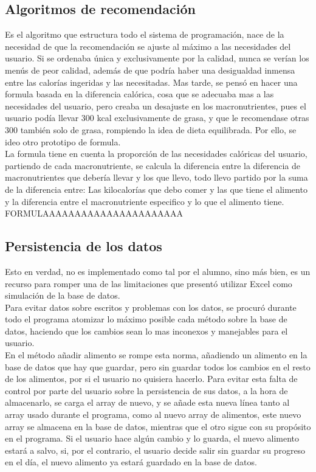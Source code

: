 \subsection{Algoritmos de recomendación}
Es el algoritmo que estructura todo el sistema de programación, nace de la necesidad de que la recomendación se ajuste al máximo a las necesidades del usuario. Si se ordenaba única y exclusivamente por la calidad, nunca se verían los menús de peor calidad, además de que podría haber una desigualdad inmensa entre las calorías ingeridas y las necesitadas. Mas tarde, se pensó en hacer una formula basada en la diferencia calórica, cosa que se adecuaba mas a las necesidades del usuario, pero creaba un desajuste en los macronutrientes, pues el usuario podía llevar 300 kcal exclusivamente de grasa, y que le recomendase otras 300 también solo de grasa, rompiendo la idea de dieta equilibrada. Por ello, se ideo otro prototipo de formula.\\
La formula tiene en cuenta la proporción de las necesidades calóricas del usuario, partiendo de cada macronutriente, se calcula la diferencia entre la diferencia de macronutrientes que debería llevar y los que llevo, todo llevo partido por la suma de la diferencia entre: Las kilocalorías que debo comer y las que tiene el alimento y la diferencia entre el macronutriente especifico y lo que el alimento tiene.\\
FORMULAAAAAAAAAAAAAAAAAAAAAA
\subsection{Persistencia de los datos}
Esto en verdad, no es implementado como tal por el alumno, sino más bien, es un recurso para romper una de las limitaciones que presentó utilizar Excel como simulación de la base de datos.\\
Para evitar datos sobre escritos y problemas con los datos, se procuró durante todo el programa atomizar lo máximo posible cada método sobre la base de datos, haciendo que los cambios sean lo mas inconexos y manejables para el usuario. \\

En el método añadir alimento se rompe esta norma, añadiendo un alimento en la base de datos que hay que guardar, pero sin guardar todos los cambios en el resto de los alimentos, por si el usuario no quisiera hacerlo. Para evitar esta falta de control por parte del usuario sobre la persistencia de sus datos, a la hora de almacenarlo, se carga el array de nuevo, y se añade esta nueva línea tanto al array usado durante el programa, como al nuevo array de alimentos, este nuevo array se almacena en la base de datos, mientras que el otro sigue con su propósito en el programa. Si el usuario hace algún cambio y lo guarda, el nuevo alimento estará a salvo, si, por el contrario, el usuario decide salir sin guardar su progreso en el día, el nuevo alimento ya estará guardado en la base de datos.\\
